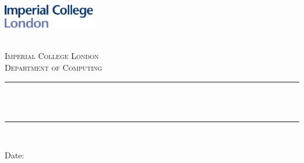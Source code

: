 \begin{titlepage}

\newcommand{\HRule}{\rule{\linewidth}{0.5mm}} %



\includegraphics[width = 4cm]{./figures/imperial}\\[0.5cm] 

\begin{center} %

\textsc{\LARGE \reporttype}\\[1.5cm] 
\textsc{\Large Imperial College London}\\[0.5cm] 
\textsc{\large Department of Computing}\\[0.5cm] 

\HRule \\[0.4cm]
{ \huge \bfseries \reporttitle}\\ %
\HRule \\[1.5cm]
\end{center}

\begin{flushleft} \large
\end{flushleft}
\vspace{2cm}
\makeatletter
Date: \@date 

\vfill %



\makeatother


\end{titlepage}

